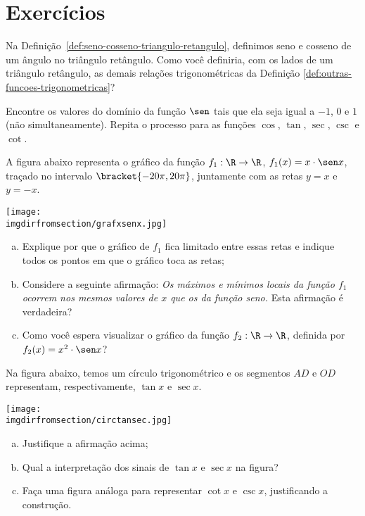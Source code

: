 \section{Exercícios}

\begin{exercise}
    Na Definição~\ref{def:seno-cosseno-triangulo-retangulo}, definimos seno e cosseno de um ângulo no
triângulo retângulo. Como você definiria, com os lados de um
triângulo retângulo, as demais relações trigonométricas da Definição
\ref{def:outras-funcoes-trigonometricas}?
\end{exercise}

\begin{exercise}
  Encontre os valores do domínio da função $\sen$ tais que ela seja igual a $-1$, $0$ e $1$ (não simultaneamente). 
  Repita o processo para as funções $\cos$, $\tan$, $\sec$, $\csc$ e $\cot$.
\end{exercise}

\begin{exercise}
    A figura abaixo representa o gráfico da função $f_1 : \R \to
\R$, $f_1(x) = x \cdot \sen x$, traçado no intervalo $\bracket{-20 \pi,
20 \pi}$, juntamente com as retas $y=x$ e $y=-x$.
\begin{center}
\texttt{[image: \\imgdirfromsection/grafxsenx.jpg]}
\end{center}
\begin{enumerate}[a)]
  \item Explique por que o gráfico de $f_1$ fica limitado entre
  essas retas e indique todos os pontos em que o gráfico toca as retas;
  \item Considere a seguinte afirmação: \emph{Os máximos e
  mínimos locais da função $f_1$ ocorrem nos mesmos valores
  de $x$ que os da função seno.} Esta afirmação é verdadeira?
  \item Como você espera visualizar o gráfico da função $f_2: \R \to
  \R$, definida por $f_2(x) = x^2 \cdot \sen x$?
\end{enumerate}
\end{exercise}

\begin{exercise}
    Na figura abaixo, temos um círculo trigonométrico e os segmentos $AD$ e $OD$ representam,
respectivamente, $\tan x$ e $\sec x$.
\begin{center}
\texttt{[image: \\imgdirfromsection/circtansec.jpg]}
\end{center}
\begin{enumerate}[a)]
  \item Justifique a afirmação acima;
  \item Qual a interpretação dos sinais de $\tan x$ e $\sec x$ na
  figura?
  \item Faça uma figura análoga para representar $\cot x$ e $\csc
  x$, justificando a construção.
\end{enumerate}
\end{exercise}

